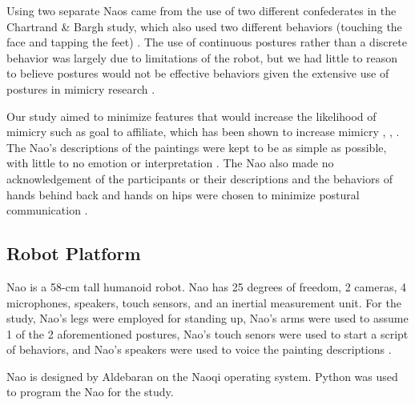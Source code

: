 \documentclass{acm_proc_article-sp}
\begin{document}
Using two separate Naos came from the use of two different confederates in  the Chartrand \& Bargh study, which also used two different behaviors (touching the face and tapping the feet) \cite{chartrand1999chameleon}. The use of continuous postures rather than a discrete behavior was largely due to limitations of the robot, but we had little to reason to believe postures would not be effective behaviors given the extensive use of postures in mimicry research \cite{chartrand2013antecedents}. 

Our study aimed to minimize features that would increase the likelihood of mimicry such as goal to affiliate, which has been shown to increase mimicry \cite{chartrand2013antecedents}, \cite{drury2006effects}, \cite{lakin2003using}. The Nao's descriptions of the paintings were kept to be as simple as possible, with little to no emotion or interpretation \cite{hofree2014bridging}. The Nao also made no acknowledgement of the participants or their descriptions and the behaviors of hands behind back and hands on hips were chosen to minimize postural communication . 

\subsection{Robot Platform}
Nao is a 58-cm tall humanoid robot. Nao has 25 degrees of freedom, 2 cameras, 4 microphones, speakers, touch sensors, and an inertial measurement unit. For the study, Nao's legs were employed for standing up, Nao's arms were used to assume 1 of the 2 aforementioned postures, Nao's touch senors were used to start a script of behaviors, and Nao's speakers were used to voice the painting descriptions \cite{naodocumentation}. 

Nao is designed by Aldebaran on the Naoqi operating system. Python was used to program the Nao for the study. 
\end{document}
